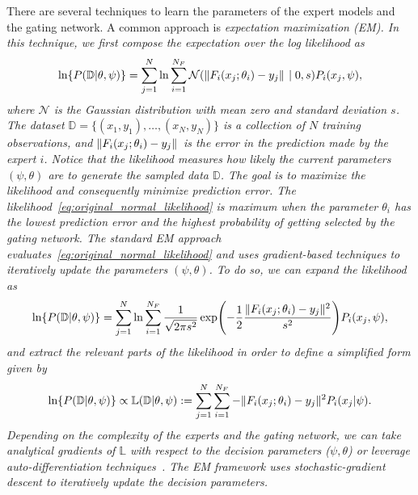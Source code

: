 There are several techniques to learn the parameters of the
expert models and the gating network. A common approach is \it{expectation
maximization} \normalfont (EM).
%
In this technique, we first compose the expectation over the log likelihood
as~\cite{bishop2006pattern}   
\begin{align}
  \ln \{P(\mathbb{D} | \theta, \psi)\} = \sum_{j=1}^{N} \ln \sum_{i=1}^{N_F} \mathcal{N}( \|{F_i(x_j; \theta_i) - y_j}\|_{{}_{}} \; | \; 0,s) P_i(x_j, \psi) ,
  \label{eq:original_normal_likelihood}
\end{align}
where $\mathcal{N}$ is the Gaussian distribution with mean zero and standard
deviation $s$. The dataset $\mathbb{D} = \{(x_1, y_1), \dots, (x_N, y_N)\}$ is a
collection of $N$ training observations, and $\|{F_i(x_j; \theta_i) - y_j}\|_{{}_{}}$
is the error in the prediction made by the expert $i$. 
% 
Notice that the likelihood measures how likely the current parameters $(\psi,
\theta)$ are to generate the sampled data $\mathbb{D}$. 
%
The goal is to maximize the likelihood and consequently minimize prediction
error.
%
The likelihood~\eqref{eq:original_normal_likelihood} is maximum when the
parameter $\theta_i$ has the lowest prediction error and the highest probability
of getting selected by the gating network.
%
The standard EM approach evaluates~\eqref{eq:original_normal_likelihood} and uses
gradient-based techniques to iteratively update the parameters $(\psi, \theta)$.
%
To do so, we can expand the likelihood as 
\begin{align*}
  \ln \{P(\mathbb{D} | \theta, \psi) \} = \sum_{j=1}^{N} \ln \sum_{i=1}^{N_F} \frac{1}{\sqrt{2 \pi s^2}} \exp \Biggl( -\frac{1}{2}\frac{\|{F_i(x_j; \theta_i) - y_j}\|_{{}_{}}^2}{s^2} \Biggr) P_i(x_j, \psi),
\end{align*}
\noindent and extract the relevant parts of the likelihood in order to
define a simplified form given by
\begin{equation}
  \ln \{P(\mathbb{D} | \theta, \psi) \} \propto \mathbb{L}(\mathbb{D} | \theta, \psi) :=  \sum_{j=1}^{N} \sum_{i=1}^{N_F} -\|{F_i(x_j; \theta_i) - y_j}\|_{{}_{}}^2 P_i(x_j | \psi). 
  \label{eq:log_normal_likelihood}
\end{equation}
%
Depending on the complexity of the experts and the gating network, we can take
analytical gradients of $\mathbb{L}$ with respect to the decision parameters
($\psi, \theta$) or leverage auto-differentiation
techniques~\cite{revels2016forward}. 
%
The EM framework uses stochastic-gradient descent to iteratively update the
decision parameters.
